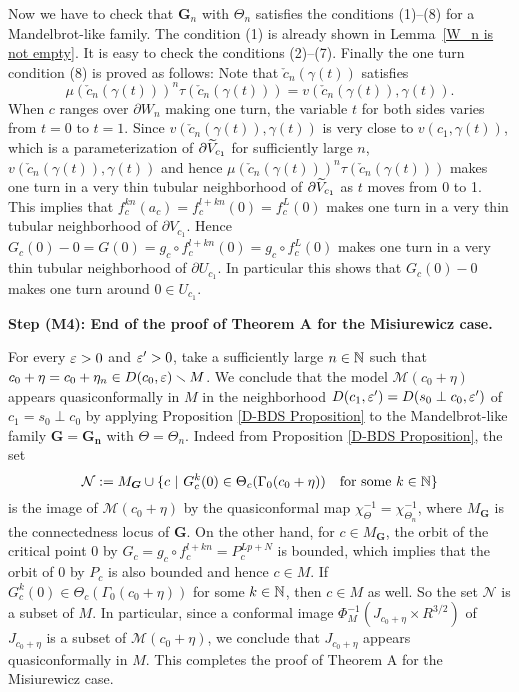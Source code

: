 Now we have to check that
$\boldsymbol{G}_n$ with $\Theta_n$
satisfies the conditions (1)--(8) for a Mandelbrot-like family.
The condition (1) is already shown in Lemma~\ref{W_n is not empty}. 
It is easy to check the conditions (2)--(7). 
Finally the one turn condition (8) is proved as follows: 
Note that $\check{c}_n(\gamma(t))$ satisfies
$$
\mu (\check{c}_n(\gamma(t)))^n 
\tau(\check{c}_n(\gamma(t)))
= v(\check{c}_n(\gamma(t)),\gamma(t)).
$$
When $c$ ranges over $\partial W_n$ making one turn, the variable $t$ for
both sides varies from $t=0$ to $t=1$. 
Since $v(\check{c}_n(\gamma(t)),\gamma(t))$ 
is very close to $v(c_1, \gamma(t))$, which is a parameterization of
$\partial \widetilde{V}_{c_1}$ for sufficiently large $n$, 
$v(\check{c}_n(\gamma(t)),\gamma(t))$ and hence
$\mu(\check{c}_n(\gamma(t)))^n \tau(\check{c}_n(\gamma(t)))$ 
makes one turn in a very thin tubular neighborhood of 
$\partial \widetilde{V}_{c_1}$ as $t$ moves from 0 to 1. 
This implies that $f_c^{kn}(a_c) = f_c^{l+kn}(0) = f_c^L(0)$ 
makes one turn in a very thin tubular neighborhood of $\partial V_{c_1}$. 
Hence $G_c(0)-0 = G(0) = g_c \circ f_c^{l+kn}(0) = g_c \circ f_c^L(0)$ makes
one turn in a very thin tubular neighborhood of $\partial U_{c_1}$. 
In particular this shows that $G_c(0)-0$ makes one turn around $0 \in U_{c_1}$.



\vskip 2mm


\noin
{\bf Step (M4): End of the proof of Theorem A for the Misiurewicz case.}

For every $\varepsilon > 0$ and $\varepsilon' > 0$, take a sufficiently large $n \in \mathbb N$ such
that $c_0 + \eta = c_0 + \eta_n \in D(c_0, \varepsilon) \smallsetminus M$. We conclude that
the model ${\mathcal M}(c_0+\eta)$ appears quasiconformally in $M$ in the neighborhood
$D(c_1, \varepsilon') = D(s_0 \perp c_0, \varepsilon')$ of $c_1 = s_0 \perp c_0$ by applying 
Proposition \ref{D-BDS Proposition} to the Mandelbrot-like family 
$\boldsymbol{G}=\boldsymbol{G_n}$ with $\Theta = \Theta_n$. Indeed from
Proposition \ref{D-BDS Proposition}, the set
$$
{\mathcal N}
:=
M_{\boldsymbol G}
\cup 
\{ c \ | \ 
     G_c^k(0) \in \Theta_c(\Gamma_0(c_0+\eta)) \quad \text{for some} \ k \in \N \}
$$
is the image of ${\mathcal M}(c_0+\eta)$ by the quasiconformal map 
$\chi_{\Theta}^{-1} = \chi_{\Theta_n}^{-1}$, where $M_{\boldsymbol G}$ is the
connectedness locus of ${\boldsymbol G}$. On the other hand, for 
$c \in M_{\boldsymbol G}$, the orbit of the critical point $0$ by 
$G_c = g_c \circ f_c^{l+kn} = P_c^{Lp+N}$ is bounded, which
implies that the orbit of $0$ by $P_c$ is also bounded and hence $c \in M$.
If $G_c^k(0) \in \Theta_c(\Gamma_0(c_0+\eta))$ for some $k \in \mathbb N$, then
$c \in M$ as well. So the set $\mathcal N$ is a subset of $M$.
In particular, since a conformal image $\Phi_M^{-1}(J_{c_0+\eta} \times R^{3/2})$
of $J_{c_0+\eta}$ is a subset of ${\mathcal M}(c_0+\eta)$, we conclude that 
$J_{c_0+\eta}$ appears 
quasiconformally in $M$. This completes the proof of Theorem A for the 
Misiurewicz case.
\QED 
\medskip

